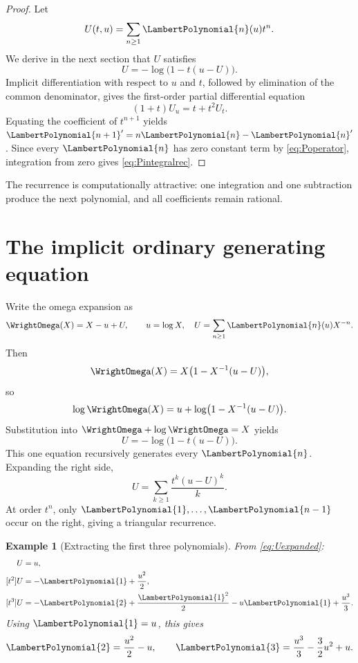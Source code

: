 \documentclass[11pt,oneside,openany]{book}
\newtheorem{example}[theorem]{Example}
\begin{document}
\begin{proof}
Let
\begin{equation}\label{eq:Ugen}
 U(t,u)=\sum_{n\geq1}\LambertPolynomial{n}(u)t^n.
\end{equation}
We derive in the next section that \(U\) satisfies
\[
 U=-\log\bigl(1-t(u-U)\bigr).
\]
Implicit differentiation with respect to \(u\) and \(t\), followed by
elimination of the common denominator, gives the first-order partial
differential equation
\begin{equation}\label{eq:UPDE}
 (1+t)U_u=t+t^2U_t.
\end{equation}
Equating the coefficient of \(t^{n+1}\) yields
\({\LambertPolynomial{n+1}}'=n\LambertPolynomial{n}-{\LambertPolynomial{n}}'\).  Since every \(\LambertPolynomial{n}\) has zero constant term by
\cref{eq:Poperator}, integration from zero gives \cref{eq:Pintegralrec}.
\end{proof}

The recurrence is computationally attractive: one integration and one
subtraction produce the next polynomial, and all coefficients remain rational.

\section{The implicit ordinary generating equation}
Write the omega expansion as
\begin{equation}\label{eq:omegaU}
 \WrightOmega(X)=X-u+U,
 \qquad u=\log X,
 \quad U=\sum_{n\geq1}\LambertPolynomial{n}(u)X^{-n}.
\end{equation}
Then
\[
 \WrightOmega(X)=X\bigl(1-X^{-1}(u-U)\bigr),
\]
so
\[
 \log\WrightOmega(X)
 =u+\log\bigl(1-X^{-1}(u-U)\bigr).
\]
Substitution into \(\WrightOmega+\log\WrightOmega=X\) yields
\begin{equation}\label{eq:Ufixed}
 \boxed{
 U=-\log\bigl(1-t(u-U)\bigr).
 }
\end{equation}
This one equation recursively generates every \(\LambertPolynomial{n}\).  Expanding the right
side,
\begin{equation}\label{eq:Uexpanded}
 U=\sum_{k\geq1}\frac{t^k(u-U)^k}{k}.
\end{equation}
At order \(t^n\), only \(\LambertPolynomial{1},\ldots,\LambertPolynomial{n-1}\) occur on the right, giving a
triangular recurrence.

\begin{example}[Extracting the first three polynomials]
From \cref{eq:Uexpanded}:
\begin{align*}
 [t]U&=u,\\
 [t^2]U&=-\LambertPolynomial{1}+\frac{u^2}{2},\\
 [t^3]U&=-\LambertPolynomial{2}+\frac{{\LambertPolynomial{1}}^2}{2}-u\LambertPolynomial{1}+\frac{u^3}{3}.
\end{align*}
Using \(\LambertPolynomial{1}=u\), this gives
\[
 \LambertPolynomial{2}=\frac{u^2}{2}-u,
 \qquad
 \LambertPolynomial{3}=\frac{u^3}{3}-\frac32u^2+u.
\]
\end{example}
\end{document}
